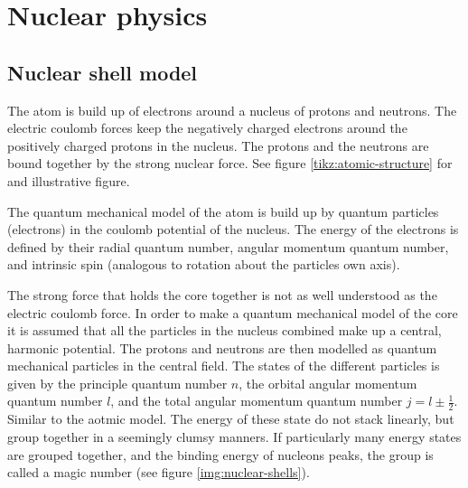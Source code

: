 \section{Nuclear physics} \label{sec:nuclear-physics}
\setlength{\figwidth}{0.5\textwidth}
\begin{figure}[h]
  
\end{figure}
\FloatBarrier

\subsection{Nuclear shell model} \label{sec:nuclear-model}
The atom is build up of electrons around a nucleus of protons and neutrons.
The electric coulomb forces keep the negatively charged electrons around the positively charged
protons in the nucleus. The protons and the neutrons are bound together by the strong nuclear force.
See figure \ref{tikz:atomic-structure} for and illustrative figure.

The quantum mechanical model of the atom is build up by quantum particles (electrons)
in the coulomb potential of the nucleus. The energy of the electrons is defined by their
radial quantum number, angular momentum quantum number, and intrinsic spin (analogous to
rotation about the particles own axis).

The strong force that holds the core together is not as well understood as the electric coulomb
force. In order to make a quantum mechanical model of the core it is assumed that all the
particles in the nucleus combined make up a central, harmonic potential. The protons and neutrons are
then modelled as quantum mechanical particles in the central field.
The states of the different particles is given by the principle quantum number $n$,
the orbital angular momentum quantum number $l$, and the total angular momentum quantum number $j=l\pm\frac{1}{2}$.
Similar to the aotmic model.
The energy of these state do not stack linearly, but group together in a seemingly clumsy manners.
If particularly many energy states are grouped together, and the binding energy of nucleons peaks,
the group is called a magic number (see figure \ref{img:nuclear-shells}).

\begin{figure}[h]
  \begin{minipage}[t][][t]{0.4\textwidth}
    
  \end{minipage}
  \hfill
  \begin{minipage}[t][][t]{0.4\textwidth}
    
  \end{minipage}
\end{figure}
\FloatBarrier


